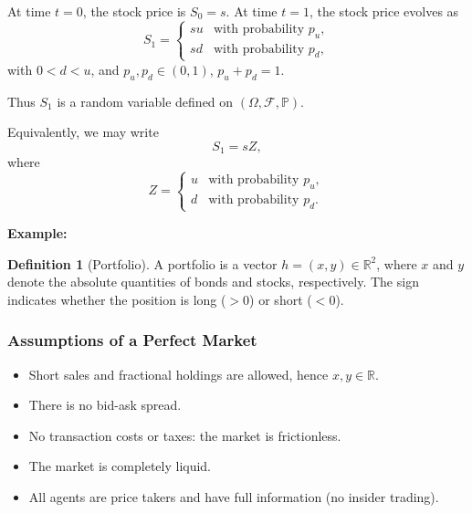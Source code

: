 \documentclass[12pt,a4paper]{article}
\theoremstyle{definition}
\newtheorem{definition}{Definition}[section]
\newcommand{\R}{\mathbb{R}}
\newcommand{\Prob}{\mathbb{P}}
\begin{document}
At time $t = 0$, the stock price is $S_0 = s$. At time $t = 1$, the stock price evolves as
\[
S_1 = \begin{cases}
su & \text{with probability } p_u, \\
sd & \text{with probability } p_d,
\end{cases}
\]
with $0 < d < u$, and $p_u, p_d \in (0,1)$, $p_u + p_d = 1$.

Thus $S_1$ is a random variable defined on $(\Omega, \mathcal{F}, \Prob)$.

Equivalently, we may write
\[
S_1 = sZ,
\]
where
\[
Z = \begin{cases}
u & \text{with probability } p_u, \\
d & \text{with probability } p_d.
\end{cases}
\]

\textbf{Example:}
\begin{center}
\end{center}

\begin{definition}[Portfolio]
A portfolio is a vector $h = (x,y) \in \R^2$, where $x$ and $y$ denote the absolute quantities of bonds and stocks, respectively. The sign indicates whether the position is long ($> 0$) or short ($< 0$).
\end{definition}

\subsubsection{Assumptions of a Perfect Market}

\begin{itemize}
\item Short sales and fractional holdings are allowed, hence $x, y \in \R$.
\item There is no bid-ask spread.
\item No transaction costs or taxes: the market is frictionless.
\item The market is completely liquid.
\item All agents are price takers and have full information (no insider trading).
\end{itemize}
\end{document}
